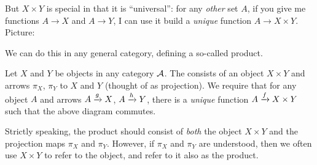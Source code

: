 But $X \times Y$ is special in that it is ``universal'':
for any \emph{other} set $A$, if you give me functions $A \to X$ and $A \to Y$, I can use it
build a \emph{unique} function $A \to X \times Y$.
Picture:
\begin{center}
\end{center}

We can do this in any general category, defining a so-called product.
\begin{definition}
	Let $X$ and $Y$ be objects in any category $\AA$.
	The  consists of an object $X \times Y$
	and arrows $\pi_X$, $\pi_Y$ to $X$ and $Y$ (thought of as projection).
	We require that for any object $A$ and arrows $A \taking g X$, $A \taking h Y$, there
	is a \emph{unique} function $A \taking f X \times Y$ such that the above diagram commutes.
\end{definition}
\begin{abuse}
	Strictly speaking, the product should consist of \emph{both}
	the object $X \times Y$
	and the projection maps $\pi_X$ and $\pi_Y$.
	However, if $\pi_X$ and $\pi_Y$ are understood,
	then we often use $X \times Y$ to refer to the object,
	and refer to it also as the product.
	\label{abuse:object}
\end{abuse}

